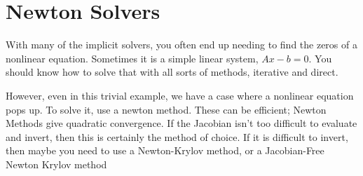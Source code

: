 \documentclass{article}
\begin{document}
\section{Newton Solvers}
With many of the implicit solvers, you often end up needing to find the zeros of a nonlinear equation. Sometimes it is a simple linear system, $Ax-b=0$. You should know how to solve that with all sorts of methods, iterative and direct.

However, even in this trivial example, we have a case where a
nonlinear equation pops up. To solve it, use a newton method. These
can be efficient; Newton Methods give quadratic convergence. If the
Jacobian isn't too difficult to evaluate and invert, then this is
certainly the method of choice. If it is difficult to invert, then
maybe you need to use a Newton-Krylov method, or a Jacobian-Free
Newton Krylov method \cite{Knoll2004}



\end{document}
